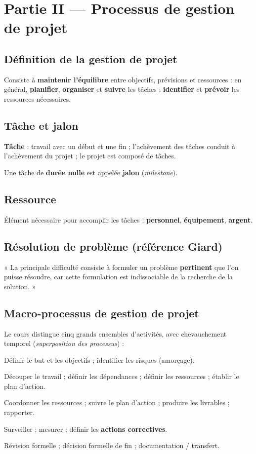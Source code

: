 \documentclass[11pt,a4paper]{article}
\begin{document}
\section{Partie II — Processus de gestion de projet}

\subsection{Définition de la gestion de projet}
Consiste à \textbf{maintenir l'équilibre} entre objectifs, prévisions et ressources : en général, \textbf{planifier}, \textbf{organiser} et \textbf{suivre} les tâches ; \textbf{identifier} et \textbf{prévoir} les ressources nécessaires.

\subsection{Tâche et jalon}
\textbf{Tâche} : travail avec un début et une fin ; l'achèvement des tâches conduit à l'achèvement du projet ; le projet est composé de tâches.

Une tâche de \textbf{durée nulle} est appelée \textbf{jalon} (\emph{milestone}).

\subsection{Ressource}
Élément nécessaire pour accomplir les tâches : \textbf{personnel}, \textbf{équipement}, \textbf{argent}.

\subsection{Résolution de problème (référence Giard)}
« La principale difficulté consiste à formuler un problème \textbf{pertinent} que l'on puisse résoudre, car cette formulation est indissociable de la recherche de la solution. »

\subsection{Macro-processus de gestion de projet}
Le cours distingue cinq grands ensembles d'activités, avec chevauchement temporel (\emph{superposition des processus}) :

\begin{description}[style=nextline]
  \item[Initialisation] Définir le but et les objectifs ; identifier les risques (amorçage).
  \item[Planification] Découper le travail ; définir les dépendances ; définir les ressources ; établir le plan d'action.
  \item[Exécution] Coordonner les ressources ; suivre le plan d'action ; produire les livrables ; rapporter.
  \item[Contrôle] Surveiller ; mesurer ; définir les \textbf{actions correctives}.
  \item[Clôture] Révision formelle ; décision formelle de fin ; documentation / transfert.
\end{description}
\end{document}
